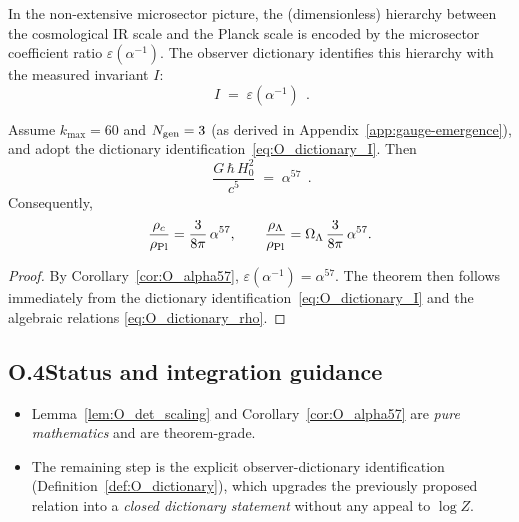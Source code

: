 \begin{definition}
\label{def:O_dictionary}
In the non-extensive microsector picture, the (dimensionless) hierarchy between the
cosmological IR scale and the Planck scale is encoded by the microsector coefficient ratio
$\varepsilon(\alpha^{-1})$. The observer dictionary identifies this hierarchy with the measured
invariant $I$:
\begin{equation}
\boxed{\;I\;=\;\varepsilon(\alpha^{-1})\;}\,.
\label{eq:O_dictionary_I}
\end{equation}
\end{definition}

\begin{theorem}
\label{thm:O_I_equals_alpha57}
Assume $k_{\max}=60$ and $N_{\rm gen}=3$ (as derived in Appendix~\ref{app:gauge-emergence}), and adopt the dictionary
identification~\eqref{eq:O_dictionary_I}. Then
\begin{equation}
\boxed{\;\frac{G\,\hbar\,H_0^2}{c^5}\;=\;\alpha^{57}\;}\,.
\end{equation}
Consequently,
\begin{equation}
\frac{\rho_c}{\rho_{\rm Pl}}=\frac{3}{8\pi}\,\alpha^{57},
\qquad
\frac{\rho_\Lambda}{\rho_{\rm Pl}}=\Omega_\Lambda\,\frac{3}{8\pi}\,\alpha^{57}.
\end{equation}
\end{theorem}

\begin{proof}
By Corollary~\ref{cor:O_alpha57}, $\varepsilon(\alpha^{-1})=\alpha^{57}$. The theorem then follows
immediately from the dictionary identification~\eqref{eq:O_dictionary_I} and the algebraic relations
\eqref{eq:O_dictionary_rho}.
\end{proof}

\subsection{O.4\quad Status and integration guidance}
\begin{itemize}
\item Lemma~\ref{lem:O_det_scaling} and Corollary~\ref{cor:O_alpha57} are \emph{pure mathematics} and are theorem-grade.
\item The remaining step is the explicit observer-dictionary identification (Definition~\ref{def:O_dictionary}),
which upgrades the previously proposed relation into a \emph{closed dictionary statement} without any appeal to $\log Z$.
\end{itemize}
